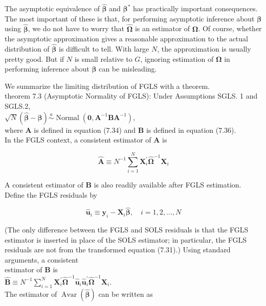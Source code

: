 \documentclass[10pt]{article}
\begin{document}
The asymptotic equivalence of $\hat{\boldsymbol{\beta}}$ and $\boldsymbol{\beta}^{*}$ has practically important consequences. The most important of these is that, for performing asymptotic inference about $\boldsymbol{\beta}$ using $\hat{\boldsymbol{\beta}}$, we do not have to worry that $\hat{\boldsymbol{\Omega}}$ is an estimator of $\boldsymbol{\Omega}$. Of course, whether the asymptotic approximation gives a reasonable approximation to the actual distribution of $\hat{\boldsymbol{\beta}}$ is difficult to tell. With large $N$, the approximation is usually pretty good. But if $N$ is small relative to $G$, ignoring estimation of $\boldsymbol{\Omega}$ in performing inference about $\boldsymbol{\beta}$ can be misleading.

We summarize the limiting distribution of FGLS with a theorem.\\
theorem 7.3 (Asymptotic Normality of FGLS): Under Assumptions SGLS. 1 and SGLS.2,\\
$\sqrt{N}(\hat{\boldsymbol{\beta}}-\boldsymbol{\beta}) \stackrel{a}{\sim} \operatorname{Normal}\left(\mathbf{0}, \mathbf{A}^{-1} \mathbf{B} \mathbf{A}^{-1}\right)$,\\
where $\mathbf{A}$ is defined in equation (7.34) and $\mathbf{B}$ is defined in equation (7.36).\\
In the FGLS context, a consistent estimator of $\mathbf{A}$ is


\begin{equation*}
\hat{\mathbf{A}} \equiv N^{-1} \sum_{i=1}^{N} \mathbf{X}_{i}^{\prime} \hat{\boldsymbol{\Omega}}^{-1} \mathbf{X}_{i} \tag{7.50}
\end{equation*}


A consistent estimator of $\mathbf{B}$ is also readily available after FGLS estimation. Define the FGLS residuals by


\begin{equation*}
\hat{\mathbf{u}}_{i} \equiv \mathbf{y}_{i}-\mathbf{X}_{i} \hat{\boldsymbol{\beta}}, \quad i=1,2, \ldots, N \tag{7.51}
\end{equation*}


(The only difference between the FGLS and SOLS residuals is that the FGLS estimator is inserted in place of the SOLS estimator; in particular, the FGLS residuals are not from the transformed equation (7.31).) Using standard arguments, a consistent\\
estimator of $\mathbf{B}$ is\\
$\hat{\mathbf{B}} \equiv N^{-1} \sum_{i=1}^{N} \mathbf{X}_{i}^{\prime} \hat{\boldsymbol{\Omega}}^{-1} \hat{\mathbf{u}}_{i} \hat{\mathbf{u}}_{i}^{\prime} \hat{\boldsymbol{\Omega}}^{-1} \mathbf{X}_{i}$.\\
The estimator of $\operatorname{Avar}(\hat{\boldsymbol{\beta}})$ can be written as
\end{document}
